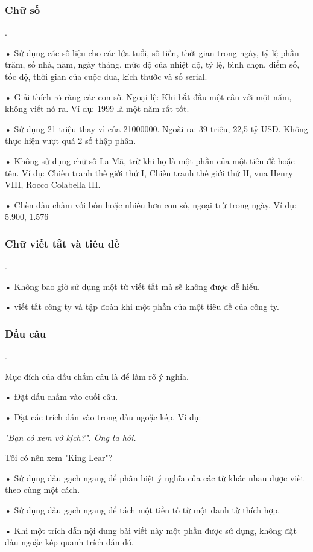 \documentclass{hcmutarticle}
\begin{document}
\subsubsection{Chữ số}.

• Sử dụng các số liệu cho các lứa tuổi, số tiền, thời gian trong ngày, tỷ lệ phần trăm, số nhà, năm, ngày tháng, mức độ của nhiệt độ, tỷ lệ, bình chọn, điểm số, tốc độ, thời gian của cuộc đua, kích thước và số serial. 

• Giải thích rõ ràng các con số. Ngoại lệ: Khi bắt đầu một câu với một năm, không viết nó ra. Ví dụ: 1999 là một năm rất tốt. 

• Sử dụng 21 triệu thay vì của 21000000. Ngoài ra: 39 triệu, 22,5 tỷ USD. Không thực hiện vượt quá 2 số thập phân.

• Không sử dụng chữ số La Mã, trừ khi họ là một phần của một tiêu đề hoặc tên. Ví dụ:
Chiến tranh thế giới thứ I, Chiến tranh thế giới thứ II, vua Henry VIII, Rocco Colabella III.

• Chèn dấu chấm với bốn hoặc nhiều hơn con số, ngoại trừ trong ngày. Ví dụ:
5.900, 1.576

\subsubsection{Chữ viết tắt và tiêu đề}.

• Không bao giờ sử dụng một từ viết tắt mà sẽ không được dễ hiểu.

• viết tắt công ty và tập đoàn khi một phần của một tiêu đề của công ty.


\subsubsection{Dấu câu}.

Mục đích của dấu chấm câu là để làm rõ ý nghĩa.

• Đặt dấu chấm vào cuối câu.

• Đặt các trích dẫn vào trong dấu ngoặc kép. Ví dụ:

{\em "Bạn có xem vở kịch?". Ông ta hỏi. 

Tôi có nên xem "King Lear"?}

• Sử dụng dấu gạch ngang để phân biệt ý nghĩa của các từ khác nhau được viết theo cùng một cách. 

• Sử dụng dấu gạch ngang để tách một tiền tố từ một danh từ thích hợp. 

• Khi một trích dẫn nội dung bài viết này một phần được sử dụng, không đặt dấu ngoặc kép quanh trích dẫn đó. 
\end{document}
